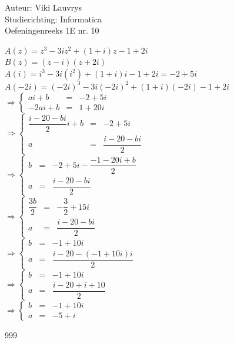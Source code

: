 \documentclass[a4paper]{article}
\begin{document}
  
\noindent \large Auteur: Viki Lauvrys        \\
\noindent \large Studierichting: Informatica \\
\noindent \large Oefeningenreeks 1E nr. 10 \\

\medskip

\normalsize

$ A(z) = z^3 - 3iz^2 + (1 + i)z - 1 + 2i $ \\

$ B(z) = (z - i) (z + 2i) $ \\

$ A(i) = i^3 - 3i(i^2) + (1 + i)i -1 + 2i = -2 + 5i $ \\

$ A(-2i) = (-2i)^3 - 3i(-2i)^2 + (1 + i)(-2i) -1 +2i $ \\

$\Rightarrow\left\{
	\begin{array}{lll}
		ai + b &=& -2 + 5i \\ 
		-2ai + b &=& 1 + 20i
	\end{array}
\right .$\\

$\Rightarrow\left\{
	\begin{array}{lll}
		\dfrac{i - 20 - bi}{2}i + b &=& -2 + 5i \\ 
		a &=& \dfrac{i - 20 - bi}{2}
	\end{array}
\right .$\\

$\Rightarrow\left\{
	\begin{array}{lll}
		b &=& -2 + 5i - \dfrac{-1 - 20i + b}{2} \\ 
		a &=& \dfrac{i - 20 - bi}{2}
	\end{array}
\right .$\\

$\Rightarrow\left\{
	\begin{array}{lll}
		\dfrac{3b}{2} &=& -\dfrac{3}{2} + 15i \\ 
		a &=& \dfrac{i - 20 - bi}{2}
	\end{array}
\right .$\\

$\Rightarrow\left\{
	\begin{array}{lll}
		b &=& -1 + 10i \\ 
		a &=& \dfrac{i - 20 - (-1 + 10i)i}{2}
	\end{array}
\right .$\\

$\Rightarrow\left\{
	\begin{array}{lll}
		b &=& -1 + 10i \\ 
		a &=& \dfrac{i - 20 + i + 10}{2}
	\end{array}
\right .$\\

$\Rightarrow\left\{
	\begin{array}{lll}
		b &=& -1 + 10i \\ 
		a &=& -5 + i
	\end{array}
\right .$\\



\begin{thebibliography}{999}
\end{thebibliography}
\end{document}
